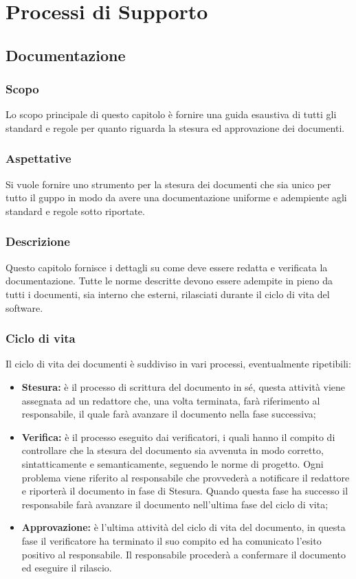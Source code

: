 \section{Processi di Supporto}

	\subsection{Documentazione}

		\subsubsection{Scopo}
			Lo scopo principale di questo capitolo è fornire una guida esaustiva di tutti gli standard e regole per quanto riguarda la stesura ed approvazione dei documenti.
		\subsubsection{Aspettative}
			Si vuole fornire uno strumento per la stesura dei documenti che sia unico per tutto il guppo in modo da avere una documentazione uniforme e adempiente agli standard e regole sotto riportate.
		\subsubsection{Descrizione}
			Questo capitolo fornisce i dettagli su come deve essere redatta e verificata la documentazione. Tutte le norme descritte devono essere adempite in pieno da tutti i documenti, sia interno che esterni, rilasciati durante il ciclo di vita del software.
		\subsubsection{Ciclo di vita}
			Il ciclo di vita dei documenti è suddiviso in vari processi, eventualmente ripetibili:
			\begin{itemize}
				\item \textbf{Stesura:} è il processo di scrittura del documento in sé, questa attività viene assegnata ad un redattore che, una volta terminata, farà riferimento al responsabile, il quale farà avanzare il documento nella fase successiva;
				\item \textbf{Verifica:} è il processo eseguito dai verificatori, i quali hanno il compito di controllare che la stesura del documento sia avvenuta in modo corretto, sintatticamente e semanticamente, seguendo le norme di progetto. Ogni problema viene riferito al responsabile che provvederà a notificare il redattore e riporterà il documento in fase di Stesura. Quando questa fase ha successo il responsabile farà avanzare il documento nell'ultima fase del ciclo di vita;
				\item \textbf{Approvazione:} è l'ultima attività del ciclo di vita del documento, in questa fase il verificatore ha terminato il suo compito ed ha comunicato l'esito positivo al responsabile. Il responsabile procederà a confermare il documento ed eseguire il rilascio.
			\end{itemize}
